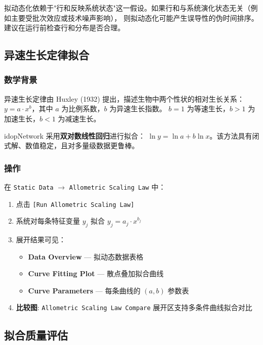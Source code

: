 \documentclass[12pt,a4paper]{ctexart}
\newcommand{\btn}[1]{\texttt{[#1]}}
\newcommand{\tab}[1]{\texttt{#1}}
\begin{document}
\begin{warnbox}[注意事项]
    拟动态化依赖于"行和反映系统状态"这一假设。如果行和与系统演化状态无关（例如主要受批次效应或技术噪声影响），
    则拟动态化可能产生误导性的伪时间排序。建议在运行前检查行和分布是否合理。
\end{warnbox}

\subsection{异速生长定律拟合}

\subsubsection{数学背景}

异速生长定律由 Huxley (1932) 提出，描述生物中两个性状的相对生长关系：
$y = a \cdot x^b$，其中 $a$ 为比例系数，$b$ 为异速生长指数。
$b = 1$ 为等速生长，$b > 1$ 为加速生长，$b < 1$ 为减速生长。

idopNetwork 采用\textbf{双对数线性回归}进行拟合：
$\ln y = \ln a + b \ln x$。该方法具有闭式解、数值稳定，且对多量级数据更鲁棒。

\subsubsection{操作}

在 \tab{Static Data} $\rightarrow$ \tab{Allometric Scaling Law} 中：
\begin{enumerate}[leftmargin=*]
    \item 点击 \btn{Run Allometric Scaling Law}
    \item 系统对每条特征变量 $y_j$ 拟合 $y_j = a_j \cdot x^{b_j}$
    \item 展开结果可见：
    \begin{itemize}
        \item \textbf{Data Overview} --- 拟动态数据表格
        \item \textbf{Curve Fitting Plot} --- 散点叠加拟合曲线
        \item \textbf{Curve Parameters} --- 每条曲线的 $(a, b)$ 参数表
    \end{itemize}
    \item \textbf{比较图}: \tab{Allometric Scaling Law Compare} 展开区支持多条件曲线拟合对比
\end{enumerate}

\subsection{拟合质量评估}
\end{document}
